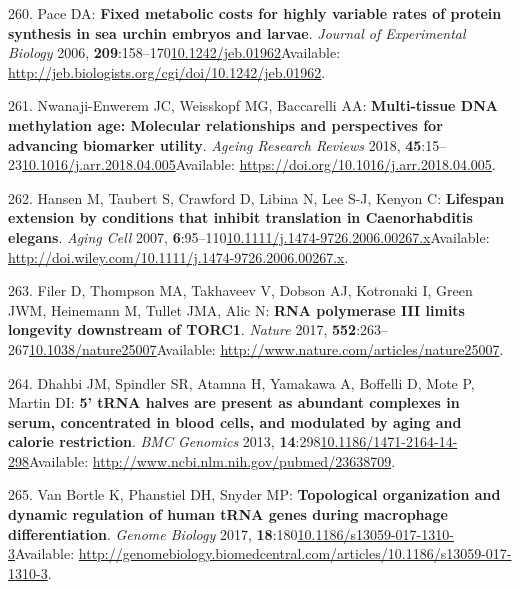 \documentclass[
]{book}
\begin{document}
\leavevmode\hypertarget{ref-Pace2006}{}%
260. Pace DA: \textbf{Fixed metabolic costs for highly variable rates of protein synthesis in sea urchin embryos and larvae}. \emph{Journal of Experimental Biology} 2006, \textbf{209}:158--170\href{https://doi.org/10.1242/jeb.01962}{10.1242/jeb.01962}Available: \url{http://jeb.biologists.org/cgi/doi/10.1242/jeb.01962}.

\leavevmode\hypertarget{ref-Nwanaji-Enwerem2018}{}%
261. Nwanaji-Enwerem JC, Weisskopf MG, Baccarelli AA: \textbf{Multi-tissue DNA methylation age: Molecular relationships and perspectives for advancing biomarker utility}. \emph{Ageing Research Reviews} 2018, \textbf{45}:15--23\href{https://doi.org/10.1016/j.arr.2018.04.005}{10.1016/j.arr.2018.04.005}Available: \url{https://doi.org/10.1016/j.arr.2018.04.005}.

\leavevmode\hypertarget{ref-Hansen2007}{}%
262. Hansen M, Taubert S, Crawford D, Libina N, Lee S-J, Kenyon C: \textbf{Lifespan extension by conditions that inhibit translation in Caenorhabditis elegans}. \emph{Aging Cell} 2007, \textbf{6}:95--110\href{https://doi.org/10.1111/j.1474-9726.2006.00267.x}{10.1111/j.1474-9726.2006.00267.x}Available: \url{http://doi.wiley.com/10.1111/j.1474-9726.2006.00267.x}.

\leavevmode\hypertarget{ref-Filer2017}{}%
263. Filer D, Thompson MA, Takhaveev V, Dobson AJ, Kotronaki I, Green JWM, Heinemann M, Tullet JMA, Alic N: \textbf{RNA polymerase III limits longevity downstream of TORC1}. \emph{Nature} 2017, \textbf{552}:263--267\href{https://doi.org/10.1038/nature25007}{10.1038/nature25007}Available: \url{http://www.nature.com/articles/nature25007}.

\leavevmode\hypertarget{ref-Dhahbi2013}{}%
264. Dhahbi JM, Spindler SR, Atamna H, Yamakawa A, Boffelli D, Mote P, Martin DI: \textbf{5' tRNA halves are present as abundant complexes in serum, concentrated in blood cells, and modulated by aging and calorie restriction}. \emph{BMC Genomics} 2013, \textbf{14}:298\href{https://doi.org/10.1186/1471-2164-14-298}{10.1186/1471-2164-14-298}Available: \url{http://www.ncbi.nlm.nih.gov/pubmed/23638709}.

\leavevmode\hypertarget{ref-VanBortle2017}{}%
265. Van Bortle K, Phanstiel DH, Snyder MP: \textbf{Topological organization and dynamic regulation of human tRNA genes during macrophage differentiation}. \emph{Genome Biology} 2017, \textbf{18}:180\href{https://doi.org/10.1186/s13059-017-1310-3}{10.1186/s13059-017-1310-3}Available: \url{http://genomebiology.biomedcentral.com/articles/10.1186/s13059-017-1310-3}.
\end{document}
